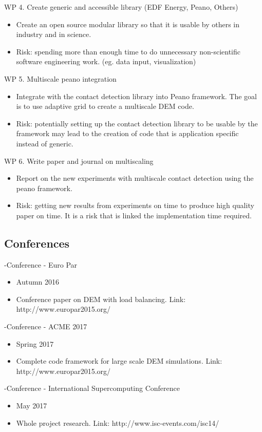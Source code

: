\documentclass[times,12pt]{article}
\begin{document}
WP 4. Create generic and accessible library (EDF Energy, Peano, Others)
\begin{itemize}
\item Create an open source modular library so that it is usable by others in industry and in science.
\item Risk: spending more than enough time to do unnecessary non-scientific software engineering work. (eg. data input, visualization)
\end{itemize}

WP 5. Multiscale peano integration
\begin{itemize}
\item Integrate with the contact detection library into Peano framework. The goal is to use adaptive grid to create a multiscale DEM code.
\item Risk: potentially setting up the contact detection library to be usable by the framework may lead to the creation of code that is application specific instead of generic. 
\end{itemize}

WP 6. Write paper and journal on multiscaling
\begin{itemize}
\item Report on the new experiments with multiscale contact detection using the peano framework.
\item Risk: getting new results from experiments on time to produce high quality paper on time. It is a risk that is linked the implementation time required.
\end{itemize}
\cite{Tian}

\subsection{Conferences}
-Conference - Euro Par
\begin{itemize}
\item Autumn 2016
\item Conference paper on DEM with load balancing. Link: http://www.europar2015.org/
\end{itemize}

-Conference - ACME 2017
\begin{itemize}
\item Spring 2017
\item Complete code framework for large scale DEM simulations. Link: http://www.europar2015.org/
\end{itemize}

-Conference - International Supercomputing Conference
\begin{itemize}
\item May 2017
\item Whole project research. Link: http://www.isc-events.com/isc14/
\end{itemize}
\end{document}
